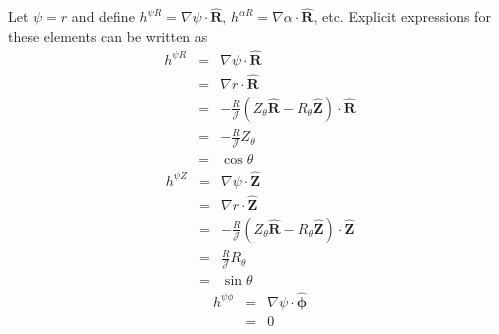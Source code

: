 \documentclass{llncs}
\newcommand{\tmmathbf}[1]{\ensuremath{\boldsymbol{#1}}}
\begin{document}
Let $\psi = r$ and define $h^{\psi R} = \nabla \psi \cdot \hat{\mathbf{R}}$,
$h^{\alpha R} = \nabla \alpha \cdot \hat{\mathbf{R}}$, etc. Explicit
expressions for these elements can be written as
\begin{eqnarray}
  h^{\psi R} & = & \nabla \psi \cdot \hat{\mathbf{R}} \nonumber\\
  & = & \nabla r \cdot \hat{\mathbf{R}} \nonumber\\
  & = & - \frac{R}{\mathcal{J}} (Z_{\theta} \hat{\mathbf{R}} - R_{\theta}
  \hat{\mathbf{Z}}) \cdot \hat{\mathbf{R}} \nonumber\\
  & = & - \frac{R}{\mathcal{J}} Z_{\theta} \nonumber\\
  & = & \cos \theta 
\end{eqnarray}
\begin{eqnarray*}
  h^{\psi Z} & = & \nabla \psi \cdot \hat{\mathbf{Z}}\\
  & = & \nabla r \cdot \hat{\mathbf{Z}}\\
  & = & - \frac{R}{\mathcal{J}} (Z_{\theta} \hat{\mathbf{R}} - R_{\theta}
  \hat{\mathbf{Z}}) \cdot \hat{\mathbf{Z}}\\
  & = & \frac{R}{\mathcal{J}} R_{\theta}\\
  & = & \sin \theta
\end{eqnarray*}
\begin{eqnarray*}
  h^{\psi \phi} & = & \nabla \psi \cdot \hat{\tmmathbf{\phi}}\\
  & = & 0
\end{eqnarray*}
\end{document}
